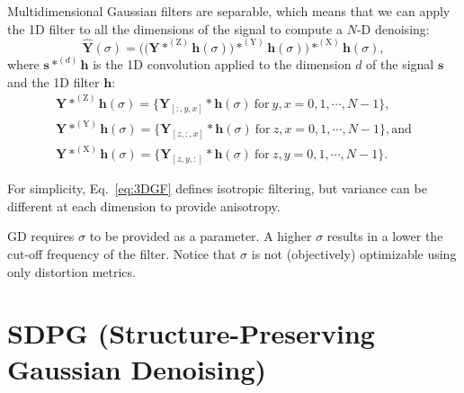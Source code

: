 \documentclass{article}
\begin{document}
Multidimensional Gaussian filters are separable, which means that we
can apply the 1D filter to all the dimensions of the signal to compute
a $N$-D denoising:
\begin{equation}
  \hat{\mathbf{Y}}(\sigma) = \Big(\big({\mathbf Y}*^{(\text{Z})}{\mathbf h}(\sigma)\big)*^{(\text{Y})}{\mathbf h}(\sigma)\Big)*^{(\text{X})}{\mathbf h}(\sigma),
    \label{eq:3DGF}
\end{equation}
where ${\mathbf s}*^{(d)}{\mathbf h}$ is the 1D convolution applied to
the dimension $d$ of the signal ${\mathbf s}$ and the 1D filter
${\mathbf h}$:
\begin{equation*}
    \begin{array}{l}
    \mathbf{Y}*^{(\text{Z})}{\mathbf h}(\sigma)=\{{\mathbf Y}_{[:,y,x]}*{\mathbf h}(\sigma)~\text{for}~y,x=0,1,\cdots,N-1\},\\
    \mathbf{Y}*^{(\text{Y})}{\mathbf h}(\sigma)=\{{\mathbf Y}_{[z,:,x]}*{\mathbf h}(\sigma)~\text{for}~z,x=0,1,\cdots,N-1\}, \text{and}\\
    \mathbf{Y}*^{(\text{X})}{\mathbf h}(\sigma)=\{{\mathbf Y}_{[z,y,:]}*{\mathbf h}(\sigma)~\text{for}~z,y=0,1,\cdots,N-1\}.
    \end{array}
\end{equation*}

For simplicity, Eq.~\ref{eq:3DGF} defines isotropic
filtering, but variance can be different at each dimension to
provide anisotropy.

GD requires $\sigma$ to be provided as a parameter. A higher $\sigma$
results in a lower the cut-off frequency of the filter. Notice that
$\sigma$ is not (objectively) optimizable using only distortion 
metrics.

\section{SDPG (Structure-Preserving Gaussian Denoising) \cite{gonzalez2023structure}}
\end{document}
